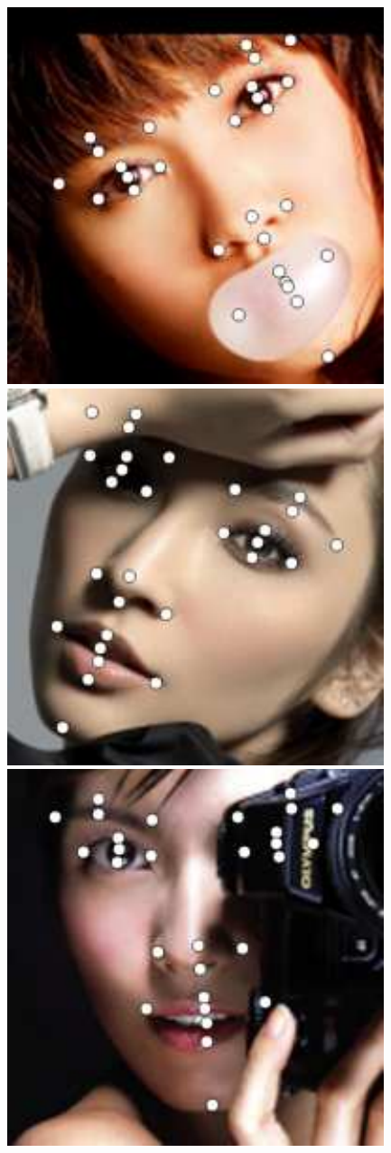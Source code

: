 \documentclass[journal]{IEEEtran}
\begin{document}
\begin{figure}[!htb]
{\begin{minipage}[b]{0.38\textwidth}
\includegraphics[scale=0.22]{29_MCNet_264}
\includegraphics[scale=0.22]{29_MCNet_150}
\includegraphics[scale=0.22]{29_MCNet_115}


\end{minipage}}
\end{figure}
\end{document}
